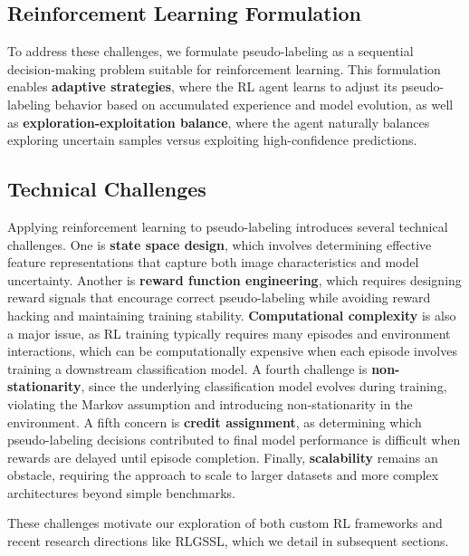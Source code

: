 \documentclass{scrartcl}
\begin{document}
\subsection{Reinforcement Learning Formulation}

To address these challenges, we formulate pseudo-labeling as a sequential decision-making problem suitable for reinforcement learning. This formulation enables \textbf{adaptive strategies}, where the RL agent learns to adjust its pseudo-labeling behavior based on accumulated experience and model evolution, as well as \textbf{exploration-exploitation balance}, where the agent naturally balances exploring uncertain samples versus exploiting high-confidence predictions.

\subsection{Technical Challenges}

Applying reinforcement learning to pseudo-labeling introduces several technical challenges. One is \textbf{state space design}, which involves determining effective feature representations that capture both image characteristics and model uncertainty. Another is \textbf{reward function engineering}, which requires designing reward signals that encourage correct pseudo-labeling while avoiding reward hacking and maintaining training stability. \textbf{Computational complexity} is also a major issue, as RL training typically requires many episodes and environment interactions, which can be computationally expensive when each episode involves training a downstream classification model. A fourth challenge is \textbf{non-stationarity}, since the underlying classification model evolves during training, violating the Markov assumption and introducing non-stationarity in the environment. A fifth concern is \textbf{credit assignment}, as determining which pseudo-labeling decisions contributed to final model performance is difficult when rewards are delayed until episode completion. Finally, \textbf{scalability} remains an obstacle, requiring the approach to scale to larger datasets and more complex architectures beyond simple benchmarks.

These challenges motivate our exploration of both custom RL frameworks and recent research directions like RLGSSL, which we detail in subsequent sections.

\end{document}
